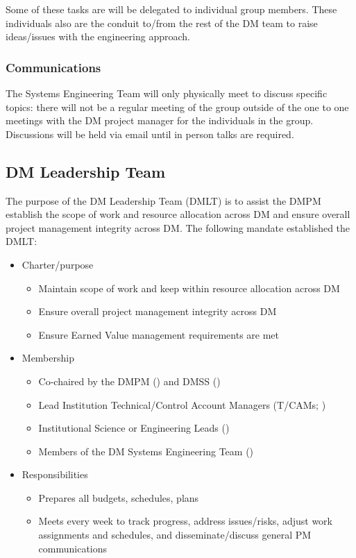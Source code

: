 Some of these tasks are will be delegated to individual group members.
These individuals also are the conduit to/from the rest of the DM team to raise ideas/issues with the engineering approach.

\subsubsection{Communications}

The Systems Engineering Team will only physically meet to discuss specific topics: there will not be a regular meeting of the group outside of the one to one meetings with the DM project manager for the individuals in the group.
Discussions will be held via email until in person talks are required.

\subsection{DM Leadership Team \label{sect:dmlt}}

The purpose of the DM Leadership Team (DMLT) is to assist the DMPM  establish the scope of work and resource allocation across DM and ensure overall project management integrity across DM.
The following mandate established the DMLT:

\begin{itemize}
\item Charter/purpose
	\begin{itemize}
	\item Maintain scope of work and keep within resource allocation across DM
	\item Ensure overall project management integrity across DM
	\item Ensure Earned Value management requirements are met
	\end{itemize}
\item Membership
	\begin{itemize}
	\item Co-chaired by the \gls{DMPM} () and \gls{DMSS} ()
	\item Lead Institution Technical/Control Account Managers (T/CAMs; )
	\item Institutional Science or Engineering Leads ()
	\item Members of the DM Systems Engineering Team ()
	\end{itemize}
\item Responsibilities
	\begin{itemize}
	\item Prepares all budgets, schedules, plans
	\item Meets every week to track progress, address issues/risks, adjust work assignments and schedules, and disseminate/discuss general PM communications
	\end{itemize}
\end{itemize}

